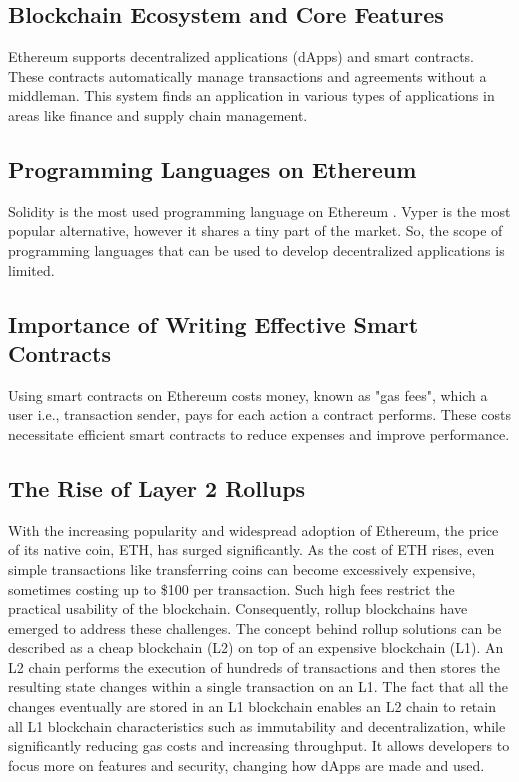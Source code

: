 \subsection{Blockchain Ecosystem and Core Features}
Ethereum supports decentralized applications (dApps) and smart contracts. These contracts automatically manage transactions and agreements without a middleman. This system finds an application in various types of applications in areas like finance and supply chain management.

\subsection{Programming Languages on Ethereum}

Solidity is the most used programming language on Ethereum \cite{SolidityWidelyUsed}. Vyper is the most popular alternative, however it shares a tiny part of the market. So, the scope of programming languages that can be used to develop decentralized applications is limited.

\subsection{Importance of Writing Effective Smart Contracts}
Using smart contracts on Ethereum costs money, known as "gas fees", which a user i.e., transaction sender, pays for each action a contract performs. These costs necessitate efficient smart contracts to reduce expenses and improve performance.

\subsection{The Rise of Layer 2 Rollups}
With the increasing popularity and widespread adoption of Ethereum, the price of its native coin, ETH, has surged significantly. As the cost of ETH rises, even simple transactions like transferring coins can become excessively expensive, sometimes costing up to \$100 per transaction. Such high fees restrict the practical usability of the blockchain. Consequently, rollup blockchains have emerged to address these challenges. The concept behind rollup solutions can be described as a cheap blockchain (L2) on top of an expensive blockchain (L1). An L2 chain performs the execution of hundreds of transactions and then stores the resulting state changes within a single transaction on an L1. The fact that all the changes eventually are stored in an L1 blockchain enables an L2 chain to retain all L1 blockchain characteristics such as immutability and decentralization, while significantly reducing gas costs and increasing throughput. It allows developers to focus more on features and security, changing how dApps are made and used.


